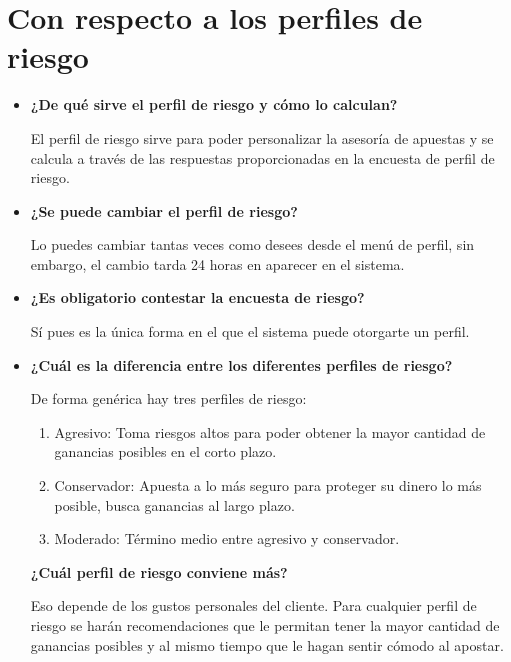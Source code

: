 \section{Con respecto a los perfiles de riesgo}
\begin{itemize}

\item \textbf{¿De qué sirve el perfil de riesgo y cómo lo calculan?}


El perfil de riesgo sirve para poder personalizar la asesoría de apuestas y se calcula a través de las respuestas proporcionadas en la encuesta de perfil de riesgo.

\item \textbf{¿Se puede cambiar el perfil de riesgo?}


Lo puedes cambiar tantas veces como desees desde el menú de perfil, sin embargo, el cambio tarda 24 horas en aparecer en el sistema.
\item \textbf{¿Es obligatorio contestar la encuesta de riesgo?}


 Sí pues es la única forma en el que el sistema puede otorgarte un perfil.

\item \textbf{¿Cuál es la diferencia entre los diferentes perfiles de riesgo?}


De forma genérica hay tres perfiles de riesgo:
\begin{enumerate}
	\item Agresivo: Toma riesgos altos para poder obtener la mayor cantidad de ganancias posibles en el corto plazo. 
	\item Conservador: Apuesta a lo más seguro para proteger su dinero lo más posible, busca ganancias al largo plazo.
	\item Moderado: Término medio entre agresivo y conservador.
\end{enumerate}

\textbf{¿Cuál perfil de riesgo conviene más?}


Eso depende de los gustos personales del cliente. Para cualquier perfil de riesgo se harán recomendaciones que le permitan tener la mayor cantidad de ganancias posibles y al mismo tiempo que le hagan sentir cómodo al apostar.
\end{itemize}

